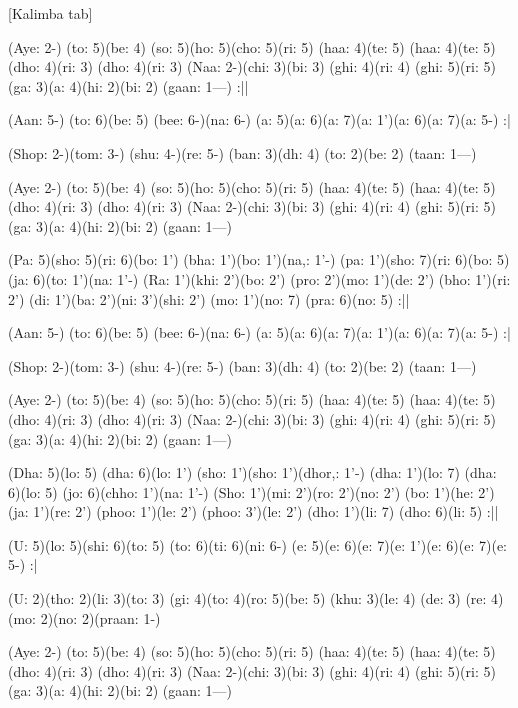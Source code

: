 \documentclass[11pt]{article}
\begin{document}
[Kalimba tab]
\begin{jianpu}
(Aye: 2-) (to: 5)(be: 4) (so: 5)(ho: 5)(cho: 5)(ri: 5) (haa: 4)(te: 5) (haa: 4)(te: 5) (dho: 4)(ri: 3) (dho: 4)(ri: 3)
(Naa: 2-)(chi: 3)(bi: 3) (ghi: 4)(ri: 4) (ghi: 5)(ri: 5) (ga: 3)(a: 4)(hi: 2)(bi: 2) (gaan: 1---) :||

(Aan: 5-) (to: 6)(be: 5) (bee: 6-)(na: 6-) (a: 5)(a: 6)(a: 7)(a: 1')(a: 6)(a: 7)(a: 5-) :|

(Shop: 2-)(tom: 3-) (shu: 4-)(re: 5-) (ban: 3)(dh: 4) (to: 2)(be: 2) (taan: 1---)

(Aye: 2-) (to: 5)(be: 4) (so: 5)(ho: 5)(cho: 5)(ri: 5) (haa: 4)(te: 5) (haa: 4)(te: 5) (dho: 4)(ri: 3) (dho: 4)(ri: 3)
(Naa: 2-)(chi: 3)(bi: 3) (ghi: 4)(ri: 4) (ghi: 5)(ri: 5) (ga: 3)(a: 4)(hi: 2)(bi: 2) (gaan: 1---)

(Pa: 5)(sho: 5)(ri: 6)(bo: 1') (bha: 1')(bo: 1')(na,: 1'-) (pa: 1')(sho: 7)(ri: 6)(bo: 5) (ja: 6)(to: 1')(na: 1'-)
(Ra: 1')(khi: 2')(bo: 2') (pro: 2')(mo: 1')(de: 2') (bho: 1')(ri: 2') (di: 1')(ba: 2')(ni: 3')(shi: 2') (mo: 1')(no: 7) (pra: 6)(no: 5) :||

(Aan: 5-) (to: 6)(be: 5) (bee: 6-)(na: 6-) (a: 5)(a: 6)(a: 7)(a: 1')(a: 6)(a: 7)(a: 5-) :|

(Shop: 2-)(tom: 3-) (shu: 4-)(re: 5-) (ban: 3)(dh: 4) (to: 2)(be: 2) (taan: 1---)

(Aye: 2-) (to: 5)(be: 4) (so: 5)(ho: 5)(cho: 5)(ri: 5) (haa: 4)(te: 5) (haa: 4)(te: 5) (dho: 4)(ri: 3) (dho: 4)(ri: 3)
(Naa: 2-)(chi: 3)(bi: 3) (ghi: 4)(ri: 4) (ghi: 5)(ri: 5) (ga: 3)(a: 4)(hi: 2)(bi: 2) (gaan: 1---)

(Dha: 5)(lo: 5) (dha: 6)(lo: 1') (sho: 1')(sho: 1')(dhor,: 1'-) (dha: 1')(lo: 7) (dha: 6)(lo: 5) (jo: 6)(chho: 1')(na: 1'-)
(Sho: 1')(mi: 2')(ro: 2')(no: 2') (bo: 1')(he: 2') (ja: 1')(re: 2') (phoo: 1')(le: 2') (phoo: 3')(le: 2') (dho: 1')(li: 7) (dho: 6)(li: 5) :||

(U: 5)(lo: 5)(shi: 6)(to: 5) (to: 6)(ti: 6)(ni: 6-) (e: 5)(e: 6)(e: 7)(e: 1')(e: 6)(e: 7)(e: 5-) :|

(U: 2)(tho: 2)(li: 3)(to: 3) (gi: 4)(to: 4)(ro: 5)(be: 5) (khu: 3)(le: 4) (de: 3) (re: 4) (mo: 2)(no: 2)(praan: 1-)

(Aye: 2-) (to: 5)(be: 4) (so: 5)(ho: 5)(cho: 5)(ri: 5) (haa: 4)(te: 5) (haa: 4)(te: 5) (dho: 4)(ri: 3) (dho: 4)(ri: 3)
(Naa: 2-)(chi: 3)(bi: 3) (ghi: 4)(ri: 4) (ghi: 5)(ri: 5) (ga: 3)(a: 4)(hi: 2)(bi: 2) (gaan: 1---)
\end{jianpu}
\end{document}
